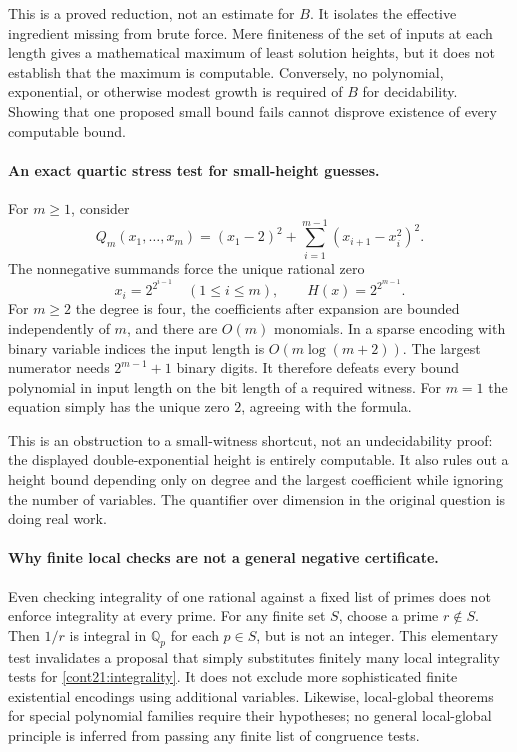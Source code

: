 \documentclass[11pt]{article}
\begin{document}
This is a proved reduction, not an estimate for $B$. It isolates the
effective ingredient missing from brute force. Mere finiteness of the
set of inputs at each length gives a mathematical maximum of least
solution heights, but it does not establish that the maximum is
computable. Conversely, no polynomial, exponential, or otherwise modest
growth is required of $B$ for decidability. Showing that one proposed
small bound fails cannot disprove existence of every computable bound.

\paragraph{An exact quartic stress test for small-height guesses.}
For $m\ge1$, consider
\begin{equation}\label{cont21:chain}
 Q_m(x_1,\ldots,x_m)=(x_1-2)^2
                  +\sum_{i=1}^{m-1}(x_{i+1}-x_i^2)^2.
\end{equation}
The nonnegative summands force the unique rational zero
\[
 x_i=2^{2^{i-1}}\quad(1\le i\le m),\qquad
 H(x)=2^{2^{m-1}}.
\]
For $m\ge2$ the degree is four, the coefficients after expansion are
bounded independently of $m$, and there are $O(m)$ monomials. In a sparse
encoding with binary variable indices the input length is
$O(m\log(m+2))$. The largest numerator needs $2^{m-1}+1$ binary digits.
It therefore defeats every bound polynomial in input length on the bit
length of a required witness. For $m=1$ the equation simply has the
unique zero $2$, agreeing with the formula.

This is an obstruction to a small-witness shortcut, not an undecidability
proof: the displayed double-exponential height is entirely computable.
It also rules out a height bound depending only on degree and the largest
coefficient while ignoring the number of variables. The quantifier over
dimension in the original question is doing real work.

\paragraph{Why finite local checks are not a general negative certificate.}
Even checking integrality of one rational against a fixed list of primes
does not enforce integrality at every prime. For any finite set $S$, choose
a prime $r\notin S$. Then $1/r$ is integral in $\mathbb Q_p$ for each
$p\in S$, but is not an integer. This elementary test invalidates a
proposal that simply substitutes finitely many local integrality tests
for \eqref{cont21:integrality}. It does not exclude more sophisticated
finite existential encodings using additional variables. Likewise,
local-global theorems for special polynomial families require their
hypotheses; no general local-global principle is inferred from passing
any finite list of congruence tests.
\end{document}
